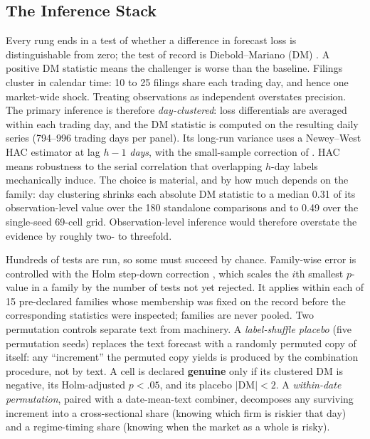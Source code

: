 \subsection{The Inference Stack}
\label{sec:design-inference}

Every rung ends in a test of whether a difference in forecast loss is distinguishable from zero; the test of record is Diebold--Mariano (DM) \cite{diebold1995comparing}. A positive DM statistic means the challenger is worse than the baseline. %
Filings cluster in calendar time: 10 to 25 filings share each trading day, and hence one market-wide shock. Treating observations as independent overstates precision. %
The primary inference is therefore \emph{day-clustered}: loss differentials are averaged within each trading day, and the DM statistic is computed on the resulting daily series (794--996 trading days per panel). Its long-run variance uses a Newey--West HAC estimator at lag $h-1$ \emph{days}, with the small-sample correction of \cite{harvey1997testing}. HAC means robustness to the serial correlation that overlapping $h$-day labels mechanically induce. %
The choice is material, and by how much depends on the family: day clustering shrinks each absolute DM statistic to a median 0.31 of its observation-level value over the 180 standalone comparisons and to 0.49 over the single-seed 69-cell grid. Observation-level inference would therefore overstate the evidence by roughly two- to threefold. %

Hundreds of tests are run, so some must succeed by chance. Family-wise error is controlled with the Holm step-down correction \cite{holm1979simple}, which scales the $i$th smallest $p$-value in a family by the number of tests not yet rejected. It applies within each of 15 pre-declared families whose membership was fixed on the record before the corresponding statistics were inspected; families are never pooled. %
Two permutation controls separate text from machinery. A \emph{label-shuffle placebo} (five permutation seeds) replaces the text forecast with a randomly permuted copy of itself: any ``increment'' the permuted copy yields is produced by the combination procedure, not by text. A cell is declared \textbf{genuine} only if its clustered DM is negative, its Holm-adjusted $p < .05$, and its placebo $|\mathrm{DM}| < 2$. %
A \emph{within-date permutation}, paired with a date-mean-text combiner, decomposes any surviving increment into a cross-sectional share (knowing which firm is riskier that day) and a regime-timing share (knowing when the market as a whole is risky). %

